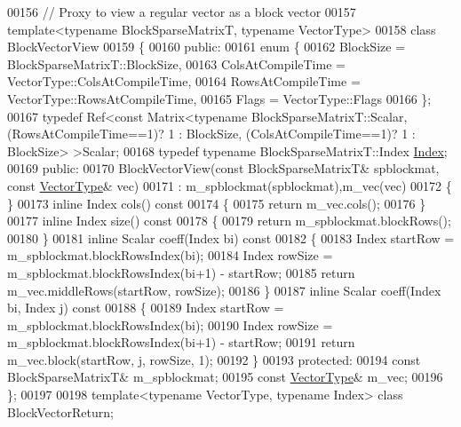 \begin{DoxyCode}
00156 \textcolor{comment}{// Proxy to view a regular vector as a block vector}
00157 \textcolor{keyword}{template}<\textcolor{keyword}{typename} BlockSparseMatrixT, \textcolor{keyword}{typename} VectorType>
00158 \textcolor{keyword}{class }BlockVectorView
00159 \{
00160   \textcolor{keyword}{public}:
00161     \textcolor{keyword}{enum} \{
00162       BlockSize = BlockSparseMatrixT::BlockSize,
00163       ColsAtCompileTime = VectorType::ColsAtCompileTime,
00164       RowsAtCompileTime = VectorType::RowsAtCompileTime,
00165       Flags = VectorType::Flags
00166     \};
00167     \textcolor{keyword}{typedef} Ref<const Matrix<typename BlockSparseMatrixT::Scalar, (RowsAtCompileTime==1)? 1 : BlockSize,
       (ColsAtCompileTime==1)? 1 : BlockSize> >Scalar;
00168     \textcolor{keyword}{typedef} \textcolor{keyword}{typename} BlockSparseMatrixT::Index \hyperlink{namespace_eigen_a62e77e0933482dafde8fe197d9a2cfde}{Index};
00169   \textcolor{keyword}{public}:
00170     BlockVectorView(\textcolor{keyword}{const} BlockSparseMatrixT& spblockmat, \textcolor{keyword}{const} \hyperlink{struct_vector_type}{VectorType}& vec)
00171     : m\_spblockmat(spblockmat),m\_vec(vec)
00172     \{ \}
00173     \textcolor{keyword}{inline} Index cols()\textcolor{keyword}{ const}
00174 \textcolor{keyword}{    }\{
00175       \textcolor{keywordflow}{return} m\_vec.cols();
00176     \}
00177     \textcolor{keyword}{inline} Index size()\textcolor{keyword}{ const}
00178 \textcolor{keyword}{    }\{
00179       \textcolor{keywordflow}{return} m\_spblockmat.blockRows();
00180     \}
00181     \textcolor{keyword}{inline} Scalar coeff(Index bi)\textcolor{keyword}{ const}
00182 \textcolor{keyword}{    }\{
00183       Index startRow = m\_spblockmat.blockRowsIndex(bi);
00184       Index rowSize = m\_spblockmat.blockRowsIndex(bi+1) - startRow;
00185       \textcolor{keywordflow}{return} m\_vec.middleRows(startRow, rowSize);
00186     \}
00187     \textcolor{keyword}{inline} Scalar coeff(Index bi, Index j)\textcolor{keyword}{ const}
00188 \textcolor{keyword}{    }\{
00189       Index startRow = m\_spblockmat.blockRowsIndex(bi);
00190       Index rowSize = m\_spblockmat.blockRowsIndex(bi+1) - startRow;
00191       \textcolor{keywordflow}{return} m\_vec.block(startRow, j, rowSize, 1);
00192     \}
00193   \textcolor{keyword}{protected}:
00194     \textcolor{keyword}{const} BlockSparseMatrixT& m\_spblockmat;
00195     \textcolor{keyword}{const} \hyperlink{struct_vector_type}{VectorType}& m\_vec;
00196 \};
00197 
00198 \textcolor{keyword}{template}<\textcolor{keyword}{typename} VectorType, \textcolor{keyword}{typename} Index> \textcolor{keyword}{class }BlockVectorReturn;

\end{DoxyCode}

